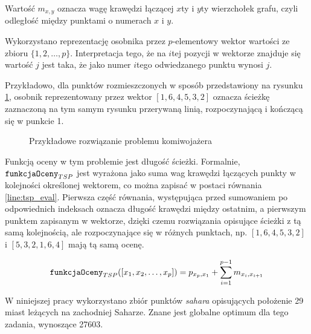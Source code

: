 \documentclass[./FM_mgr.tex]{subfiles}
\begin{document}
	Wartość $m_{x, y}$ oznacza wagę krawędzi łączącej $x$ty i $y$ty wierzchołek grafu, czyli odległość między punktami o numerach $x$ i $y$.
	
	Wykorzystano reprezentację osobnika przez $p$-elementowy wektor wartości ze zbioru $\{ 1, 2, \ldots, p \}$.
	Interpretacja tego, że na $i$tej pozycji w wektorze znajduje się wartość $j$ jest taka, że jako numer $i$tego odwiedzanego punktu wynosi $j$.
	
	Przykładowo, dla punktów rozmieszczonych w sposób przedstawiony na rysunku \ref{figure:tsp_example}, osobnik reprezentowany przez wektor $[1, 6, 4, 5, 3, 2]$ oznacza ścieżkę zaznaczoną na tym samym rysunku przerywaną linią, rozpoczynającą i kończącą się w punkcie 1.
	
	\begin{figure} [H]
		\caption{Przykładowe rozwiązanie problemu komiwojażera \label{figure:tsp_example}}
		\centering
	\end{figure}
	
	Funkcją oceny w tym problemie jest długość ścieżki. 
	Formalnie, $\mathtt{funkcjaOceny}_{TSP}$ jest wyrażona jako suma wag krawędzi łączących punkty w kolejności określonej wektorem, co można zapisać w postaci równania \ref{line:tsp_eval}. 
	Pierwsza część równania, występująca przed sumowaniem po odpowiednich indeksach oznacza długość krawędzi między ostatnim, a pierwszym punktem zapisanym w wektorze, dzięki czemu rozwiązania opisujące ścieżki z tą samą kolejnością, ale rozpoczynające się w różnych punktach, np. $[1, 6, 4, 5, 3, 2]$ i $[5, 3, 2, 1, 6, 4]$ mają tą samą ocenę.
	
	\begin{align}
	\mathtt{funkcjaOceny}_{TSP}([x_1, x_2, \ldots, x_p]) = p_{x_p, x_1} + \sum_{i=1}^{p-1} m_{x_i, x_{i+1}} \label{line:tsp_eval}
	\end{align}
	
	W niniejszej pracy wykorzystano zbiór punktów \emph{sahara} \cite{sahara_points} opisujących położenie 29 miast leżących na zachodniej Saharze. 
	Znane jest globalne optimum dla tego zadania, wynoszące 27603.
	
\end{document}
